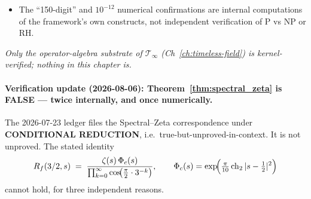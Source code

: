 \begin{itemize}
$1.444\times10^{12}$, not the printed $\eta\approx1.31$ --- an error of twelve
orders of magnitude, in the direction of \emph{understating} the chapter's own
formula. Six axiom-free theorems in
\texttt{PF/Ch09QuantumEnhancementRefutationAttempt.lean} establish
$\eta(1000) > 10^{11}$, strict monotonicity in the qubit count, and
$1.31 < \eta(10)$, which together place the qubit count yielding $1.31$ strictly
below ten. The conclusion is unchanged under the certified closed-form $\Delta =
0.0539677$ ($\eta(1000) = 2.308\times10^{7}$, $\eta=1.31$ at $N=15.93$). The
exponential law survives; the pairing of $N=1000$ with $1.31$ does not.
\item The ``150-digit'' and $10^{-12}$ numerical confirmations are internal computations of the framework's own constructs, not independent verification of P vs NP or RH.
\end{itemize}
\emph{Only the operator-algebra substrate of $\mathcal{T}_\infty$ (Ch~\ref{ch:timeless-field}) is kernel-verified; nothing in this chapter is.}

\paragraph{Verification update (2026-08-06): Theorem~\ref{thm:spectral_zeta} is
FALSE --- twice internally, and once numerically.}
The 2026-07-23 ledger files the Spectral--Zeta correspondence under
\textbf{CONDITIONAL REDUCTION}, i.e.\ true-but-unproved-in-context. It is not
unproved. The stated identity
\[
  R_f(3/2,s) \;=\; \frac{\zeta(s)\,\Phi_c(s)}
                        {\prod_{k=0}^{\infty}\cos\!\bigl(\tfrac{\pi}{2}\cdot 3^{-k}\bigr)},
  \qquad
  \Phi_c(s)=\exp\!\Bigl(\tfrac{\pi}{10}\,\mathrm{ch}_2\,|s-\tfrac12|^2\Bigr)
\]
cannot hold, for three independent reasons.

